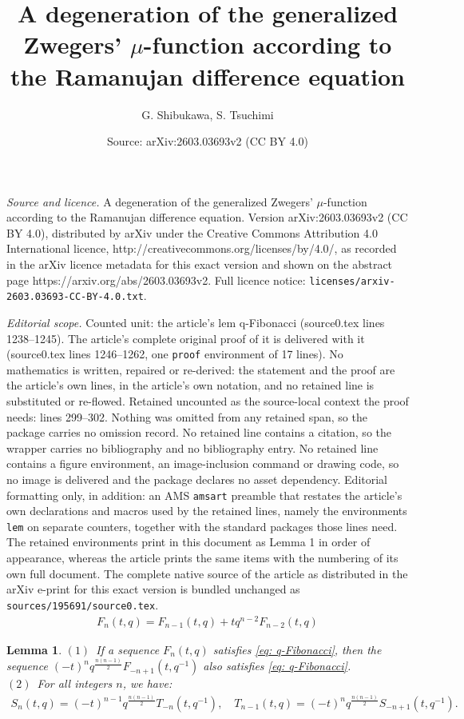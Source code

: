 \documentclass[10pt,a4paper]{amsart}
\title{A degeneration of the generalized Zwegers' $\mu$-function according to the Ramanujan difference equation}
\author{G. Shibukawa, S. Tsuchimi}
\date{Source: arXiv:2603.03693v2 (CC BY 4.0)}
\newtheorem{lem}{Lemma}
\begin{document}
\maketitle

\noindent\emph{Source and licence.} A degeneration of the generalized Zwegers' $\mu$-function according to the Ramanujan difference equation. Version arXiv:2603.03693v2 (CC BY 4.0), distributed by arXiv under the Creative Commons Attribution 4.0 International licence, http://creativecommons.org/licenses/by/4.0/, as recorded in the arXiv licence metadata for this exact version and shown on the abstract page https://arxiv.org/abs/2603.03693v2. Full licence notice: \texttt{licenses/arxiv-2603.03693-CC-BY-4.0.txt}.\par\smallskip

\noindent\textit{Editorial scope.} Counted unit: the article's lem q-Fibonacci (source0.tex lines 1238--1245). The article's complete original proof of it is delivered with it (source0.tex lines 1246--1262, one \texttt{proof} environment of 17 lines). No mathematics is written, repaired or re-derived: the statement and the proof are the article's own lines, in the article's own notation, and no retained line is substituted or re-flowed.  Retained uncounted as the source-local context the proof needs: lines 299--302.  Nothing was omitted from any retained span, so the package carries no omission record.  No retained line contains a citation, so the wrapper carries no bibliography and no bibliography entry.  No retained line contains a figure environment, an image-inclusion command or drawing code, so no image is delivered and the package declares no asset dependency.  Editorial formatting only, in addition: an AMS \texttt{amsart} preamble that restates the article's own declarations and macros used by the retained lines, namely the environments \texttt{lem} on separate counters, together with the standard packages those lines need.  The retained environments print in this document as Lemma 1 in order of appearance, whereas the article prints the same items with the numbering of its own full document.  The complete native source of the article as distributed in the arXiv e-print for this exact version is bundled unchanged as \texttt{sources/195691/source0.tex}.
\begin{align}
\label{eq: q-Fibonacci}
F_n(t,q)=F_{n-1}(t,q)+tq^{n-2}F_{n-2}(t,q)
\end{align}

\begin{lem}
\label{lem: q-Fibonacci}
$(1)$\ If a sequence $F_n(t,q)$ satisfies \eqref{eq: q-Fibonacci}, then the sequence $(-t)^nq^\frac{n(n-1)}{2}F_{-n+1}\left(t,q^{-1}\right)$ also satisfies \eqref{eq: q-Fibonacci}. \\
$(2)$\ For all integers $n$, we have: 
\begin{align*}
S_n(t,q)=(-t)^{n-1}q^\frac{n(n-1)}{2}T_{-n}\left(t,q^{-1}\right),\quad T_{n-1}(t,q)=(-t)^{n}q^\frac{n(n-1)}{2}S_{-n+1}\left(t,q^{-1}\right). 
\end{align*}
\end{lem}
\end{document}
